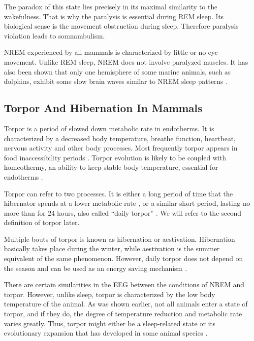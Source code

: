\documentclass[14pt,a4paper]{scrartcl}
\begin{document}
The paradox of this state lies precisely in its maximal similarity to the wakefulness. That is why the paralysis is essential during REM sleep. Its biological sense is the movement obstruction during sleep. Therefore paralysis violation leads to somnambulism.

NREM experienced by all mammals is characterized by little or no eye movement. Unlike REM sleep, NREM does not involve paralyzed muscles. It has also been shown that only one hemisphere of some marine animals, such as dolphins, exhibit some slow brain waves similar to NREM sleep patterns \citep{Mascetti2016}.


\subsection{Torpor And Hibernation In Mammals}
\label{sec:Introduction:Torpor And Hibernation In Mammals}

Torpor is a period of slowed down metabolic rate in endotherms. It is characterized by a decreased body temperature, breathe function, heartbeat, nervous activity and other body processes. Most frequently torpor appears in food inaccessibility periods \citep{Vuarin2015}. Torpor evolution is likely to be coupled with homeothermy, an ability to keep stable body temperature, essential for endotherms \citep{Geiser2017}. 

Torpor can refer to two processes. It is either a long period of time that the hibernator spends at a lower metabolic rate \citep{Heller2004}, or a similar short period, lasting no more than for 24 hours, also called “daily torpor” \citep{Geiser2004}. We will refer to the second definition of torpor later. 

Multiple bouts of torpor is known as hibernation or aestivation. Hibernation basically takes place during the winter, while aestivation is the summer equivalent of the same phenomenon. However, daily torpor does not depend on the season and can be used as an energy saving mechanism \citep{Ruf2015}.

There are certain similarities in the EEG between the conditions of NREM and torpor. However, unlike sleep, torpor is characterized by the low body temperature of the animal. As was shown earlier, not all animals enter a state of torpor, and if they do, the degree of temperature reduction and metabolic rate varies greatly. Thus, torpor might either be a sleep-related state or its evolutionary expansion that has developed in some animal species \citep{Silvani2018}. 
\end{document}

